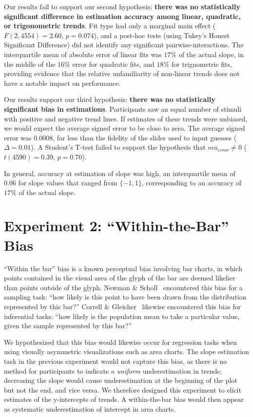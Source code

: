 \documentclass{sigchi}
\begin{document}
Our results fail to support our second hypothesis: \textbf{there was no statistically significant difference in estimation accuracy among linear, quadratic, or trigonometric trends}. Fit type had only a marginal main effect ($F(2,4554)=2.60$, $p=0.074$), and a post-hoc tests (using Tukey's Honest Significant Difference) did not identify any significant pairwise-interactions. The interquartile mean of absolute  error of linear fits was $17\%$ of the actual slope, in the middle of the $16\%$ error for quadratic fits, and $18\%$ for trignometric fits, providing evidence that the relative unfamiliarity of non-linear trends does not have a notable impact on performance.

Our results support our third hypothesis: \textbf{there was no statistically significant bias in estimations}. Participants saw an equal number of stimuli with positive and negative trend lines. If estimates of these trends were unbiased, we would expect the average signed error to be close to zero. The average signed error was $0.0008$, far less than the fidelity of the slider used to input guesses ($\Delta=0.01$). A Student's T-test failed to support the hypothesis that $mu_{error}\ne0$ ($t(4590) = 0.39$, $p=0.70$).

In general, accuracy at estimation of slope was high, an interquartile mean of $0.06$ for slope values that ranged from $\{-1,1\}$, corresponding to an accuracy of $17\%$ of the actual slope.

\section{Experiment 2: ``Within-the-Bar'' Bias}

\expTwoTypesFig

``Within the bar'' bias is a known perceptual bias involving bar charts, in which points contained in the visual area of the glyph of the bar are deemed likelier than points outside of the glyph. Newman \& Scholl~\cite{newman2012bar} encountered this bias for a sampling task: ``how likely is this point to have been drawn from the distribution represented by this bar?'' Correll \& Gleicher~\cite{correll2014error} likewise encountered this bias for inferential tasks: ``how likely is the population mean to take a particular value, given the sample represented by this bar?''

We hypothesized that this bias would likewise occur for regression tasks when using visually asymmetric visualizations such as area charts. The slope estimation task in the previous experiment would not capture this bias, as there is no method for participants to indicate a \emph{uniform} underestimation in trends; decreasing the slope would cause underestimation at the beginning of the plot but not the end, and vice versa. We therefore designed this experiment to elicit estimates of the y-intercepts of trends. A within-the-bar bias would then appear as systematic underestimation of intercept in area charts.
\end{document}
